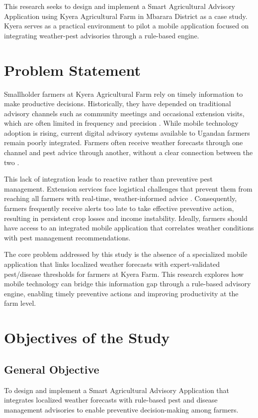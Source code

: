 \documentclass[12pt]{report}
\begin{document}
This research seeks to design and implement a Smart Agricultural Advisory Application using Kyera Agricultural Farm in Mbarara District as a case study. Kyera serves as a practical environment to pilot a mobile application focused on integrating weather-pest advisories through a rule-based engine.

\section{Problem Statement}
Smallholder farmers at Kyera Agricultural Farm rely on timely information to make productive decisions. Historically, they have depended on traditional advisory channels such as community meetings and occasional extension visits, which are often limited in frequency and precision \cite{UBOS2023}. While mobile technology adoption is rising, current digital advisory systems available to Ugandan farmers remain poorly integrated. Farmers often receive weather forecasts through one channel and pest advice through another, without a clear connection between the two \cite{WorldBank2022}.

This lack of integration leads to reactive rather than preventive pest management. Extension services face logistical challenges that prevent them from reaching all farmers with real-time, weather-informed advice \cite{MAAIF2019}. Consequently, farmers frequently receive alerts too late to take effective preventive action, resulting in persistent crop losses and income instability. Ideally, farmers should have access to an integrated mobile application that correlates weather conditions with pest management recommendations.

The core problem addressed by this study is the absence of a specialized mobile application that links localized weather forecasts with expert-validated pest/disease thresholds for farmers at Kyera Farm. This research explores how mobile technology can bridge this information gap through a rule-based advisory engine, enabling timely preventive actions and improving productivity at the farm level.

\section{Objectives of the Study}
\subsection{General Objective}
To design and implement a Smart Agricultural Advisory Application that integrates localized weather forecasts with rule-based pest and disease management advisories to enable preventive decision-making among farmers.
\end{document}
